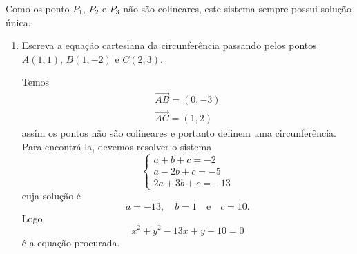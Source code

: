 Como os ponto $P_1$, $P_2$ e $P_3$ n\~ao s\~ao colineares, este sistema sempre possui solu\c{c}\~ao \'unica.

\begin{exemplos}
  \begin{enumerate}
    \item Escreva a equa\c{c}\~ao cartesiana da circunfer\^encia passando pelos pontos $A(1,1)$, $B(1,-2)$ e $C(2,3)$.
    \begin{solucao}
      Temos
      \begin{align*}
        \vec{AB} = (0,-3)\\
        \vec{AC} = (1,2)
      \end{align*}
      assim os pontos n\~ao s\~ao colineares e portanto definem uma circunfer\^encia. Para encontr\'a-la, devemos resolver o sistema
      \[
        \begin{cases}
          a + b + c = -2\\
          a - 2b + c = -5\\
          2a + 3b + c = -13
        \end{cases}
      \]
      cuja solu\c{c}\~ao \'e
      \[
        a = -13,\quad b = 1 \quad\mbox{e}\quad c = 10.
      \]
      Logo
      \[
        x^2 + y^2 - 13x + y - 10 = 0
      \]
      \'e a equa\c{c}\~ao procurada.


\end{solucao}
\end{enumerate}
\end{exemplos}
